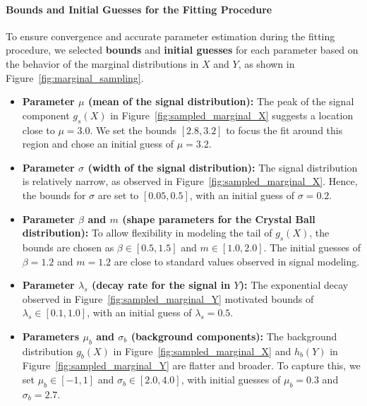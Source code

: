 \documentclass[11pt, a4paper]{article}
\begin{document}
\paragraph{Bounds and Initial Guesses for the Fitting Procedure}


To ensure convergence and accurate parameter estimation during the fitting procedure, we selected \textbf{bounds} and \textbf{initial guesses} for each parameter based on the behavior of the marginal distributions in \(X\) and \(Y\), as shown in Figure~\ref{fig:marginal_sampling}.

\begin{itemize}
    \item \textbf{Parameter \( \mu \) (mean of the signal distribution):} The peak of the signal component \( g_s(X) \) in Figure~\ref{fig:sampled_marginal_X} suggests a location close to \( \mu = 3.0 \). We set the bounds \([2.8, 3.2]\) to focus the fit around this region and chose an initial guess of \( \mu = 3.2 \).

    \item \textbf{Parameter \( \sigma \) (width of the signal distribution):} The signal distribution is relatively narrow, as observed in Figure~\ref{fig:sampled_marginal_X}. Hence, the bounds for \( \sigma \) are set to \([0.05, 0.5]\), with an initial guess of \( \sigma = 0.2 \).

    \item \textbf{Parameter \( \beta \) and \( m \) (shape parameters for the Crystal Ball distribution):} To allow flexibility in modeling the tail of \( g_s(X) \), the bounds are chosen as \(\beta \in [0.5, 1.5]\) and \(m \in [1.0, 2.0]\). The initial guesses of \( \beta = 1.2 \) and \( m = 1.2 \) are close to standard values observed in signal modeling.

    \item \textbf{Parameter \( \lambda_s \) (decay rate for the signal in \(Y\)):} The exponential decay observed in Figure~\ref{fig:sampled_marginal_Y} motivated bounds of \( \lambda_s \in [0.1, 1.0] \), with an initial guess of \( \lambda_s = 0.5 \).

    \item \textbf{Parameters \( \mu_b \) and \( \sigma_b \) (background components):} The background distribution \( g_b(X) \) in Figure~\ref{fig:sampled_marginal_X} and \( h_b(Y) \) in Figure~\ref{fig:sampled_marginal_Y} are flatter and broader. To capture this, we set \( \mu_b \in [-1, 1] \) and \( \sigma_b \in [2.0, 4.0] \), with initial guesses of \( \mu_b = 0.3 \) and \( \sigma_b = 2.7 \).


\end{itemize}
\end{document}
